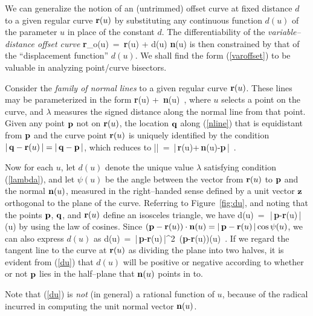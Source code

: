 We can generalize the notion of an (untrimmed) offset curve at fixed
distance $d$ to a given regular curve ${\bf r}(u)$ by substituting
any continuous function $d(u)$ of the parameter $u$ in place of the
constant $d$. The differentiability of the {\it variable--distance
offset curve}
\be \label{varoffset}
{\bf r}_o(u) \,=\, {\bf r}(u) + d(u) {\bf n}(u)
\ee
is then constrained by that of the ``displacement function'' $d(u)$.
We shall find the form (\ref{varoffset}) to be valuable in analyzing
point/curve bisectors.

Consider the {\it family of normal lines\/} to a given regular curve
${\bf r}(u)$. These lines may be parameterized in the form
\be \label{nline}
{\bf r}(u) + \lambda\,{\bf n}(u) \,,
\ee
where $u$ selects a point on the curve, and $\lambda$ measures the
signed distance along the normal line from that point. Given any point
${\bf p}$ not on ${\bf r}(u)$, the location ${\bf q}$
along (\ref{nline}) that is equidistant from ${\bf p}$ and
the curve point ${\bf r}(u)$ is uniquely identified by the condition
$|\,{\bf q}-{\bf r}(u)\,|=|\,{\bf q}-{\bf p}\,|$, which reduces to
\be \label{lambda}
|\lambda\:\!| \,=\, |\,{\bf r}(u)+\lambda\,{\bf n}(u)-{\bf p}\,| \,.
\ee


Now for each $u$, let $d(u)$ denote the unique value $\lambda$
satisfying condition (\ref{lambda}), and let $\psi(u)$ be the angle
between the vector from ${\bf r}(u)$ to ${\bf p}$ and the normal
${\bf n}(u)$, measured in the right--handed sense defined by a unit
vector ${\bf z}$ orthogonal to the plane of the curve. Referring to
Figure~\ref{fig:du}, and noting that the points ${\bf p}$, ${\bf q}$,
and ${\bf r}(u)$ define an isosceles triangle, we have
\be \label{du0}
d(u) \,=\, \half\,|\,{\bf p}-{\bf r}(u)\,|\sec\psi(u)
\ee
by using the law of cosines.
Since $({\bf p}-{\bf r}(u))\cdot{\bf n}(u)=|\,{\bf p}-{\bf r}(u)\,|
\cos\psi(u)$, we can also express $d(u)$ as
\be \label{du}
d(u) \,=\, {|\,{\bf p}-{\bf r}(u)\,|^2 \,({\bf p}-{\bf r}(u))(u)} \,.
\ee
If we regard the tangent line to the curve at ${\bf r}(u)$ as dividing
the plane into two halves, it is evident from (\ref{du}) that $d(u)$
will be positive or negative according to whether or not ${\bf p}$
lies in the half--plane that ${\bf n}(u)$ points in to.

Note that (\ref{du}) is {\it not\/} (in general) a rational function
of $u$, because of the radical incurred in computing the unit normal
vector ${\bf n}(u)$.

